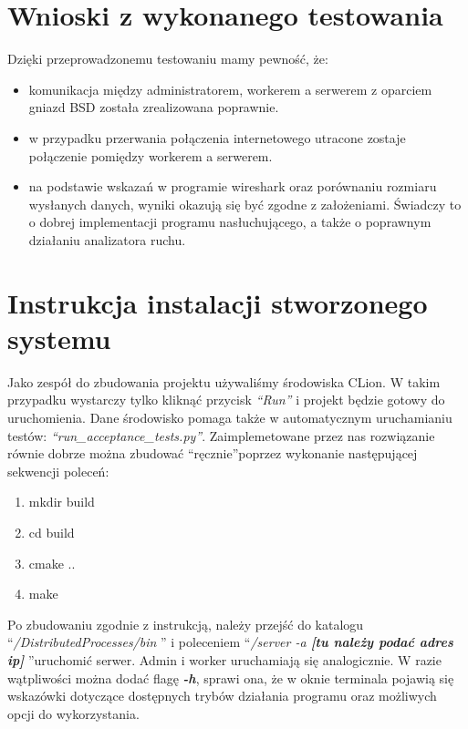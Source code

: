 \documentclass[paper=a4, fontsize=11pt]{scrartcl} %
\begin{document}
\section{Wnioski z wykonanego testowania}
Dzięki przeprowadzonemu testowaniu mamy pewność, że:
\begin{itemize}
\item komunikacja między administratorem, workerem a serwerem z oparciem gniazd BSD została zrealizowana poprawnie.
\item w przypadku przerwania połączenia internetowego utracone zostaje
połączenie pomiędzy workerem a serwerem.
\item na podstawie wskazań w programie wireshark oraz porównaniu
rozmiaru wysłanych danych, wyniki okazują się być zgodne z założeniami. Świadczy to o dobrej implementacji programu nasłuchującego, a także o poprawnym działaniu analizatora ruchu.
\end{itemize}
\section{Instrukcja instalacji stworzonego systemu}
Jako zespół do zbudowania projektu używaliśmy środowiska CLion. W takim przypadku wystarczy tylko kliknąć przycisk \textit{\textquotedblleft  Run\textquotedblright} i projekt będzie gotowy do uruchomienia. Dane środowisko pomaga także w automatycznym uruchamianiu testów: \textit{\textquotedblleft  run\_acceptance\_tests.py\textquotedblright}.  
\newline Zaimplemetowane przez nas rozwiązanie równie dobrze można zbudować \textquotedblleft  ręcznie\textquotedblright poprzez wykonanie następującej sekwencji poleceń:
\begin{enumerate}
\item mkdir build
\item cd build
\item cmake ..
\item make
\end{enumerate}
Po zbudowaniu zgodnie z instrukcją, należy przejść do katalogu 
\newline \textquotedblleft \textit{/DistributedProcesses/bin} \textquotedblright
\newline i poleceniem \textquotedblleft \textit{/server -a \textbf{[tu należy podać adres ip]}} \textquotedblright uruchomić serwer.
\newline Admin i worker uruchamiają się analogicznie. W razie wątpliwości można dodać flagę \textit{\textbf{-h}}, sprawi ona, że w oknie terminala pojawią się wskazówki dotyczące dostępnych trybów działania programu oraz możliwych opcji do wykorzystania.
\end{document}
